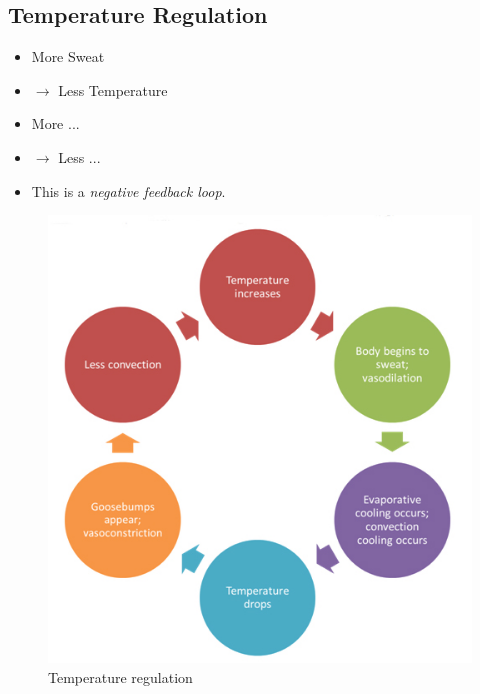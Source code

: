 \subsection{Temperature Regulation}
\label{subsec:examples-temperature}
\begin{frame}{\insertsubsection}
    \begin{minipage}[t]{0.349\textwidth}
        \begin{itemize}[<+->]
            \item More Sweat
            \item[ ] $\rightarrow$ Less Temperature
            \item More ...
            \item[ ] $\rightarrow$ Less ...
            \item This is a \emph{negative feedback loop}.
        \end{itemize}
    \end{minipage}%
    \begin{minipage}[t]{0.649\textwidth}
        \begin{figure}
            \centering
            \includegraphics[width=\textwidth]{media/Temperature-Regulation.jpg}
            \caption{Temperature regulation~\cite{albert2022}}
        \end{figure}
    \end{minipage}%
\end{frame}
%
%

